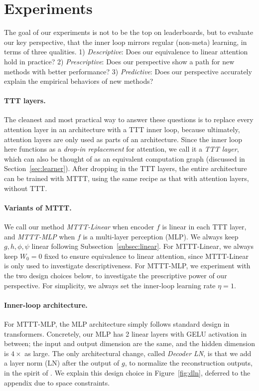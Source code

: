 \documentclass{article} %
\begin{document}
\section{Experiments}
\label{sec:exp}

The goal of our experiments is not to be the top on leaderboards, but to evaluate our key perspective, that the inner loop mirrors regular (non-meta) learning, in terms of three qualities.
1) \emph{Descriptive}: Does our equivalence to linear attention hold in practice?
2) \emph{Prescriptive}: Does our perspective show a path for new methods with better performance?
3) \emph{Predictive}: Does our perspective accurately explain the empirical behaviors of new methods?

\paragraph{TTT layers.}
The cleanest and most practical way to answer these questions is to replace every attention layer in an architecture with a TTT inner loop, because ultimately, attention layers are only used as parts of an architecture.
Since the inner loop here functions as a \emph{drop-in replacement} for attention, we call it a \emph{TTT layer}, which can also be thought of as an equivalent computation graph (discussed in Section~\ref{sec:learner}).
After dropping in the TTT layers, the entire architecture can be trained with MTTT, using the same recipe as that with attention layers, without TTT.

\paragraph{Variants of MTTT.}
We call our method \emph{MTTT-Linear} when encoder $f$ is linear in each TTT layer, and \emph{MTTT-MLP} when $f$ is a multi-layer perception (MLP). 
We always keep $g, h, \phi, \psi$ linear following Subsection~\ref{subsec:linear}.
For MTTT-Linear, we always keep $W_0=0$ fixed to ensure equivalence to linear attention, since MTTT-Linear is only used to investigate descriptiveness.
For MTTT-MLP, we experiment with the two design choices below, to investigate the prescriptive power of our perspective.
For simplicity, we always set the inner-loop learning rate $\eta=1$. 

\paragraph{Inner-loop architecture.} 
For MTTT-MLP, the MLP architecture simply follows standard design in transformers. 
Concretely, our MLP has 2 linear layers with GELU activation in between; the input and output dimension are the same, and the hidden dimension is $4\times$ as large.
The only architectural change, called \emph{Decoder LN}, is that we add a layer norm (LN) after the output of $g$, to normalize the reconstruction outputs, in the spirit of \cite{mae}.
We explain this design choice in Figure~\ref{fig:dln}, deferred to the appendix due to space constraints.
\end{document}
